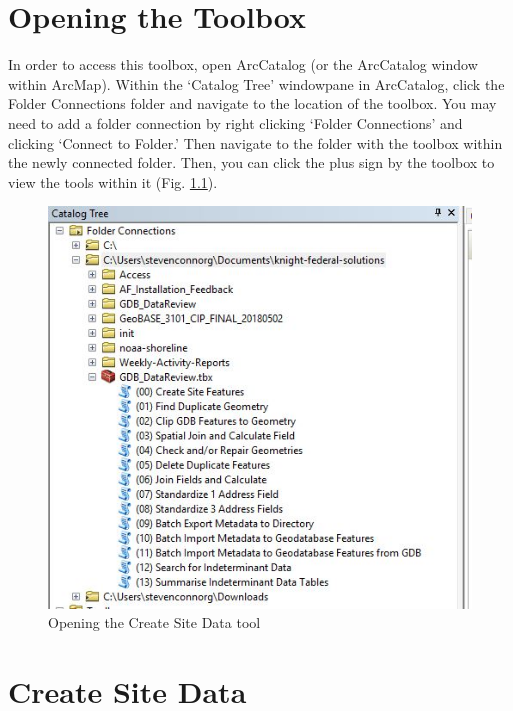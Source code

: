 \documentclass[openany]{book}
\theoremstyle{definition}
\theoremstyle{definition}
\theoremstyle{definition}
\theoremstyle{remark}
\begin{document}
\chapter{Opening the Toolbox}\label{opening-the-toolbox}

In order to access this toolbox, open ArcCatalog (or the ArcCatalog
window within ArcMap). Within the `Catalog Tree' windowpane in
ArcCatalog, click the Folder Connections folder and navigate to the
location of the toolbox. You may need to add a folder connection by
right clicking `Folder Connections' and clicking `Connect to Folder.'
Then navigate to the folder with the toolbox within the newly connected
folder. Then, you can click the plus sign by the toolbox to view the
tools within it (Fig. \ref{fig:opentoolbox}).

\begin{figure}[H]

{\centering \includegraphics{figures/opentoolbox} 

}

\caption{Opening the Create Site Data tool}\label{fig:opentoolbox}
\end{figure}

\pagebreak
\printindex

\chapter{Create Site Data}\label{siteData}
\end{document}
